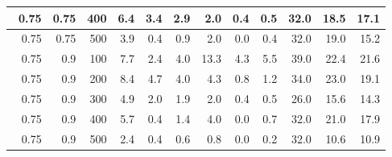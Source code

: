 \begin{longtable}{|r|r|r|r|r|r|r|r|r|r|r|r|}
    \hline \
    0.75                           & 0.75                     & 400                       & 6.4                       & 3.4                       & 2.9                       & 2.0                      & 0.4                       & 0.5                       & 32.0                      & 18.5                      & 17.1                      \\
    \hline \
    0.75                           & 0.75                     & 500                       & 3.9                       & 0.4                       & 0.9                       & 2.0                       & 0.0                       & 0.4                       & 32.0                      & 19.0                      & 15.2                      \\
    \hline \
    0.75                           & 0.9                     & 100                       & 7.7                       & 2.4                       & 4.0                       & 13.3                       & 4.3                       & 5.5                       & 39.0                      & 22.4                      & 21.6                      \\
    \hline \
    0.75                           & 0.9                     & 200                       & 8.4                       & 4.7                       & 4.0                       & 4.3                       & 0.8                       & 1.2                       & 34.0                      & 23.0                      & 19.1                      \\
    \hline \
    0.75                           & 0.9                     & 300                       & 4.9                       & 2.0                       & 1.9                       & 2.0                       & 0.4                       & 0.5                       & 26.0                      & 15.6                      & 14.3                      \\
    \hline \
    0.75                            & 0.9                     & 400                       & 5.7                      & 0.4                       & 1.4                       & 4.0                      & 0.0                      & 0.7                      & 32.0                      & 21.0                      & 17.9                      \\
    \hline \
    0.75                            & 0.9                     & 500                       & 2.4                      & 0.4                       & 0.6                       & 0.8                      & 0.0                       & 0.2                       & 32.0                      & 10.6                      & 10.9                      \\

\end{longtable}
